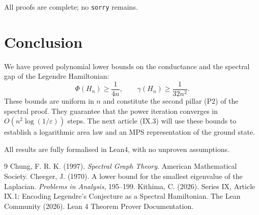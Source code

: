\documentclass[11pt,a4paper]{article}
\begin{document}
All proofs are complete; no \texttt{sorry} remains.

\section{Conclusion}

We have proved polynomial lower bounds on the conductance and the spectral gap of the Legendre Hamiltonian:
\[
\Phi(H_n) \ge \frac{1}{4n},\qquad \gamma(H_n) \ge \frac{1}{32n^2}.
\]
These bounds are uniform in $n$ and constitute the second pillar (P2) of the spectral proof. They guarantee that the power iteration converges in $O(n^2 \log(1/\varepsilon))$ steps. The next article (IX.3) will use these bounds to establish a logarithmic area law and an MPS representation of the ground state.

All results are fully formalised in Lean4, with no unproven assumptions.


\begin{thebibliography}{9}
  Chung, F. R. K. (1997). \emph{Spectral Graph Theory}. American Mathematical Society.
  Cheeger, J. (1970). A lower bound for the smallest eigenvalue of the Laplacian. \emph{Problems in Analysis}, 195–199.
  Kithima, C. (2026). Series IX, Article IX.1: Encoding Legendre's Conjecture as a Spectral Hamiltonian.
  The Lean Community (2026). Lean 4 Theorem Prover Documentation.
\end{thebibliography}
\end{document}
